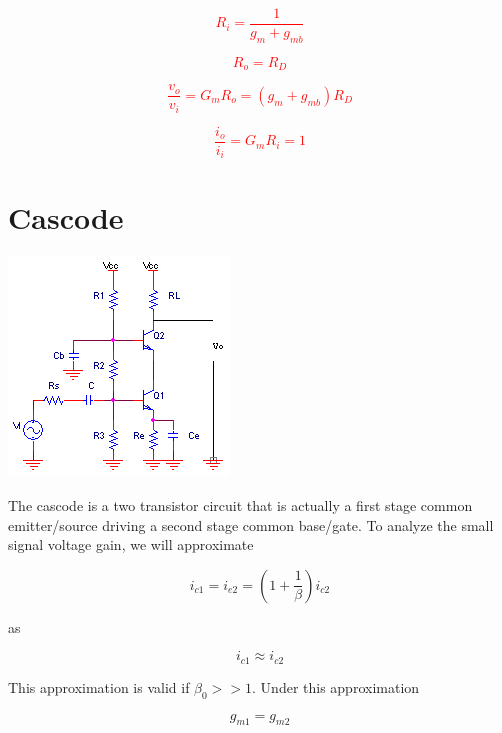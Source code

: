 \textcolor{red}{
\begin{equation}
R_{i} = \frac{1}{g_{m}+g_{mb}}
\end{equation}
}

\textcolor{red}{
\begin{equation}
R_{o} = R_{D}
\label{eq:common_gate_Ro}
\end{equation}
}

\textcolor{red}{
\begin{equation}
\frac{v_{o}}{v_{i}} = G_{m}R_{o} = (g_{m}+g_{mb})R_{D}
\end{equation}
}

\textcolor{red}{
\begin{equation}
\frac{i_{o}}{i_{i}} = G_{m}R_{i} = 1
\end{equation}
}

\section{Cascode}
\begin{center}
	\includegraphics{schematics/cascode.PNG}
\end{center}
The cascode is a two transistor circuit that is actually a first stage common emitter/source driving a second stage common base/gate. To analyze the small signal voltage gain, we will approximate

\begin{equation}
i_{c1} = i_{e2} = \left(1+\frac{1}{\beta}\right)i_{c2}
\end{equation}

\noindent as

\begin{equation}
i_{c1} \approx i_{c2}
\end{equation}

\noindent This approximation is valid if $\beta_{0} >> 1$. Under this approximation 

\begin{equation}
g_{m1} = g_{m2}
\end{equation}

